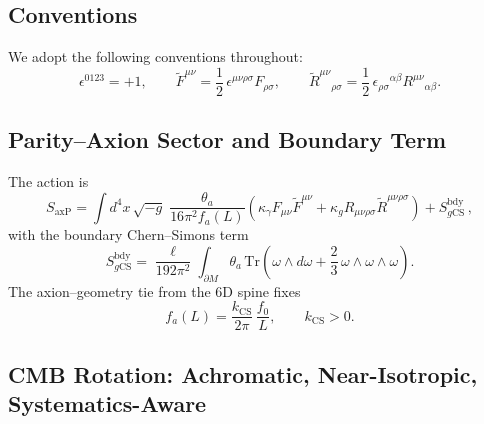 \documentclass[11pt]{article}
\begin{document}
\subsection{Conventions}
We adopt the following conventions throughout:
\begin{equation}
\epsilon^{0123} = +1, 
\qquad 
\tilde{F}^{\mu\nu} = \frac{1}{2}\,\epsilon^{\mu\nu\rho\sigma} F_{\rho\sigma}, 
\qquad 
\tilde{R}^{\mu\nu}{}_{\rho\sigma} = \frac{1}{2}\,\epsilon_{\rho\sigma}{}^{\alpha\beta} R^{\mu\nu}{}_{\alpha\beta}.
\end{equation}

\subsection{Parity--Axion Sector and Boundary Term}

The action is
\begin{equation}
\label{eq:SaxP}
S_{\mathrm{axP}} 
= \int d^4x\, \sqrt{-g}\; \frac{\theta_a}{16\pi^2 f_a(L)}\!
\left( 
\kappa_\gamma F_{\mu\nu} \tilde{F}^{\mu\nu} + 
\kappa_g R_{\mu\nu\rho\sigma}\tilde{R}^{\mu\nu\rho\sigma} 
\right) + S^{\mathrm{bdy}}_{g\mathrm{CS}}\, ,
\end{equation}
with the boundary Chern--Simons term
\begin{equation}
S^{\mathrm{bdy}}_{g\mathrm{CS}} 
= \frac{\ell}{192\pi^2} \int_{\partial M} 
\theta_a\, \mathrm{Tr}\!\left(\omega \wedge d\omega + \frac{2}{3}\,\omega \wedge \omega \wedge \omega \right).
\end{equation}
The axion--geometry tie from the 6D spine fixes
\begin{equation}
f_a(L) = \frac{k_{\mathrm{CS}}}{2\pi}\,\frac{f_0}{L}, \qquad k_{\mathrm{CS}} > 0.
\end{equation}

\subsection{CMB Rotation: Achromatic, Near-Isotropic, Systematics-Aware}
\end{document}
